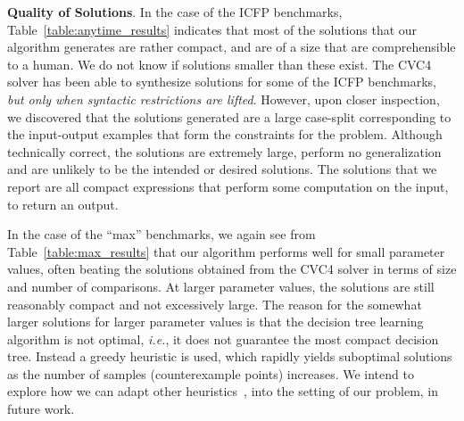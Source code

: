\documentclass{llncs}
\newcommand{\ie}{\emph{i.e.}}
\newcommand{\dcsolve}{{\sffamily\fontsize{8.5}{10}\selectfont
    DCSolve}\xspace}
\renewcommand{\paragraph}[1]{\par\noindent\textbf{#1}.}
\begin{document}

\paragraph{Quality of Solutions}
In the case of the ICFP benchmarks, Table~\ref{table:anytime_results}
indicates that most of the solutions that our algorithm generates are
rather compact, and are of a size that are comprehensible to a
human. We do not know if solutions smaller than these exist. The CVC4
solver has been able to synthesize solutions for some of the ICFP
benchmarks, {\em but only when syntactic restrictions are lifted}. However,
upon closer inspection, we discovered that the solutions generated are a
large case-split corresponding to the input-output examples that form
the constraints for the problem. Although technically correct, the
solutions are extremely large, perform no generalization and are
unlikely to be the intended or desired solutions.
The solutions that we report are all compact expressions that perform some
computation on the input, to return an output.

In the case of the ``max'' benchmarks, we again see from
Table~\ref{table:max_results} that our algorithm performs well for
small parameter values, often beating the solutions obtained from the
CVC4 solver in terms of size and number of comparisons.
At larger parameter values, the solutions are still reasonably compact
and not excessively large.
The reason for the somewhat larger solutions for
larger parameter values is that the decision tree learning algorithm
is not optimal, \ie, it does not guarantee the most compact decision
tree. Instead a greedy heuristic is used, which rapidly yields
suboptimal solutions as the number of samples (counterexample points)
increases.
We intend to explore how we can adapt other
heuristics~\cite{madhusudan-16-pw}, into the setting of our problem, in
future work.
\end{document}
